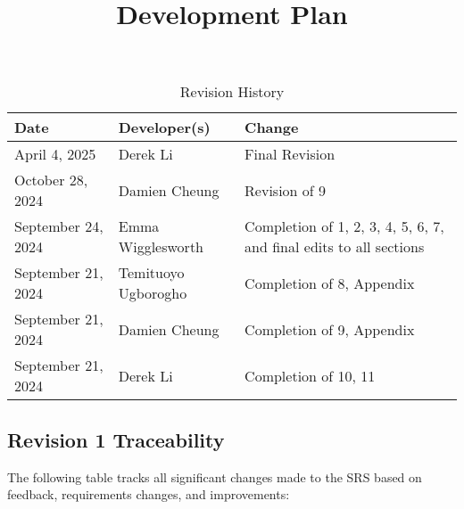 \documentclass{article}
\title{Development Plan\\\progname}
\author{\authname}
\date{}
\begin{document}
\maketitle

\begin{table}[hp]
\caption{Revision History} \label{TblRevisionHistory}
\begin{tabularx}{\textwidth}{llX}
\toprule
\textbf{Date} & \textbf{Developer(s)} & \textbf{Change}\\
\midrule
April 4, 2025 & Derek Li & Final Revision\\
October 28, 2024 & Damien Cheung & Revision of 9\\
September 24, 2024 & Emma Wigglesworth & Completion of 1, 2, 3, 4, 5, 6, 7, and final edits to all sections\\
September 21, 2024 & Temituoyo Ugborogho & Completion of 8, Appendix\\
September 21, 2024 & Damien Cheung & Completion of 9, Appendix\\
September 21, 2024 & Derek Li & Completion of 10, 11\\
\bottomrule
\end{tabularx}
\end{table}

\subsection{Revision 1 Traceability}
The following table tracks all significant changes made to the SRS based on feedback, requirements changes, and improvements:
\end{document}
